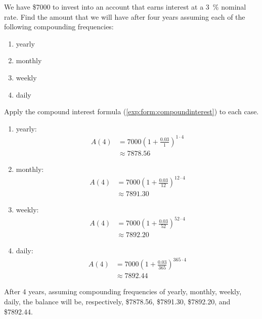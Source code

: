 			
\begin{pccexample}\label{exp:ex:compoundinterest}
	We have \$7000 to invest into an account that earns interest at a \SI{3}{\percent} nominal rate. Find the amount that we 
	will have after four years assuming each of the following compounding frequencies:
	\begin{multicols}{4}
		\begin{enumerate}
			\item yearly
			\item monthly
			\item weekly
			\item daily
		\end{enumerate}
	\end{multicols}
	\begin{pccsolution} Apply the compound interest formula (\cref{exp:form:compoundinterest}) to each case.
		\begin{multicols}{2}
			\begin{enumerate}
				\vspace{\fill}
				\item yearly:
				\begin{align*}
					A(4) & =  7000\left(1+\frac{0.03}{1}\right)^{1\cdot 4} \\
					     & \approx  7878.56                                
				\end{align*}
				\item monthly:
				\begin{align*}
					A(4) & =  7000\left(1+\frac{0.03}{12}\right)^{12\cdot 4} \\
					     & \approx  7891.30                                  
				\end{align*}
				\vspace{\fill}
				\columnbreak
				\vspace{\fill}
				\item weekly:
				\begin{align*}
					A(4) & =  7000\left(1+\frac{0.03}{52}\right)^{52\cdot 4} \\
					     & \approx  7892.20                                  
				\end{align*}
				\item daily:
				\begin{align*}
					A(4) & =  7000\left(1+\frac{0.03}{365}\right)^{365\cdot 4} \\
					     & \approx  7892.44                                    
				\end{align*}
				\vspace*{\fill}
			\end{enumerate}
		\end{multicols}
		After 4 years, assuming compounding frequencies of yearly, monthly, weekly, daily, the balance 
		will be, respectively, \$7878.56, \$7891.30, \$7892.20, and \$7892.44.
	\end{pccsolution}
\end{pccexample}
			
